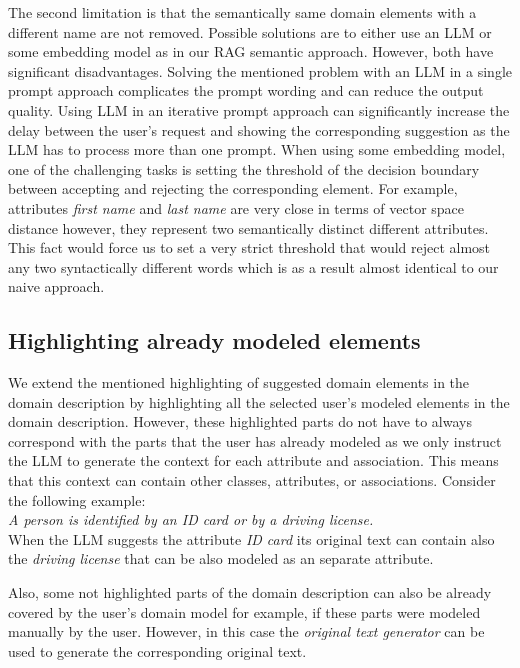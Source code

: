 The second limitation is that the semantically same domain elements with a different name are not removed. Possible solutions are to either use an LLM or some embedding model as in our RAG semantic approach. However, both have significant disadvantages. Solving the mentioned problem with an LLM in a single prompt approach complicates the prompt wording and can reduce the output quality. Using LLM in an iterative prompt approach can significantly increase the delay between the user's request and showing the corresponding suggestion as the LLM has to process more than one prompt. When using some embedding model, one of the challenging tasks is setting the threshold of the decision boundary between accepting and rejecting the corresponding element. For example, attributes \textit{first name} and \textit{last name} are very close in terms of vector space distance however, they represent two semantically distinct different attributes. This fact would force us to set a very strict threshold that would reject almost any two syntactically different words which is as a result almost identical to our naive approach.


\subsection{Highlighting already modeled elements}
\label{sec:highlighting_already_modeled_elements}

We extend the mentioned highlighting of suggested domain elements in the domain description by highlighting all the selected user's modeled elements in the domain description. However, these highlighted parts do not have to always correspond with the parts that the user has already modeled as we only instruct the LLM to generate the context for each attribute and association. This means that this context can contain other classes, attributes, or associations. Consider the following example: \\

\noindent{} \textit{A person is identified by an ID card or by a driving license.} \\

\noindent{} When the LLM suggests the attribute \textit{ID card} its original text can contain also the \textit{driving license} that can be also modeled as an separate attribute.

Also, some not highlighted parts of the domain description can also be already covered by the user's domain model for example, if these parts were modeled manually by the user. However, in this case the \emph{original text generator} can be used to generate the corresponding original text.



